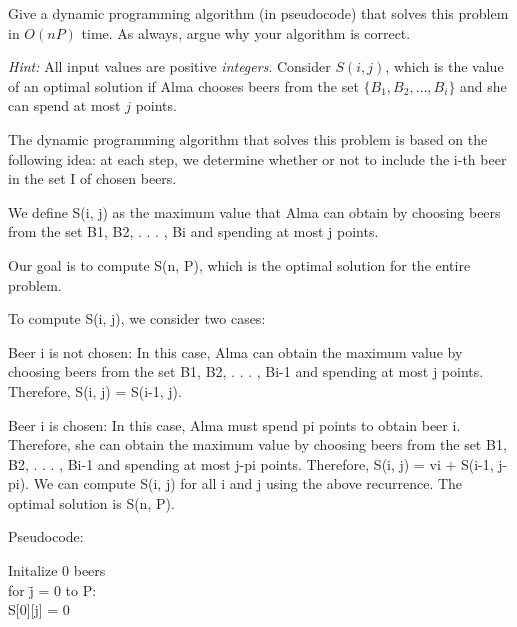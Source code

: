 \documentclass[12pt]{article}
\newcounter{ques}
\newenvironment{question}{\stepcounter{ques}{\noindent\bf Question \arabic{ques}:}}{\vspace{5mm}}
\newenvironment{solution}{{\noindent\bf Solution:}}{\vspace{5mm}}
\begin{document}
\begin{question}
Give a dynamic programming algorithm (in pseudocode) that solves this 
problem in $O(nP)$ time. As always, argue why your algorithm is 
correct. 

\noindent 
\emph{Hint:} All input values are positive \emph{integers}. Consider 
$S(i,j)$, which is the value of an optimal solution if Alma chooses 
beers from the set $\{B_1,B_2,\ldots,B_i\}$ and she can spend at most 
$j$ points.   
\end{question}

\begin{solution}
      
      The dynamic programming algorithm that solves this problem is based on the following idea: at each step, we determine whether or not to include the i-th beer in the set I of chosen beers.

      We define S(i, j) as the maximum value that Alma can obtain by choosing beers from the set {B1, B2, . . . , Bi} and spending at most j points.

      Our goal is to compute S(n, P), which is the optimal solution for the entire problem.

      To compute S(i, j), we consider two cases:

      Beer i is not chosen: In this case, Alma can obtain the maximum value by choosing beers from the set {B1, B2, . . . , Bi-1} and spending at most j points. Therefore, S(i, j) = S(i-1, j).
      
      Beer i is chosen: In this case, Alma must spend pi points to obtain beer i. Therefore, she can obtain the maximum value by choosing beers from the set {B1, B2, . . . , Bi-1} and spending at most j-pi points. 
      Therefore, S(i, j) = vi + S(i-1, j-pi).
      We can compute S(i, j) for all i and j using the above recurrence. The optimal solution is S(n, P).

      Pseudocode:

      

      \begin{tabbing}
            Initalize 0 beers \\

            for \= j = 0 to P: \\

            \> S[0][j] = 0 \\            
      \end{tabbing}

      \begin{tabbing}
      

\end{tabbing}
\end{solution}
\end{document}

